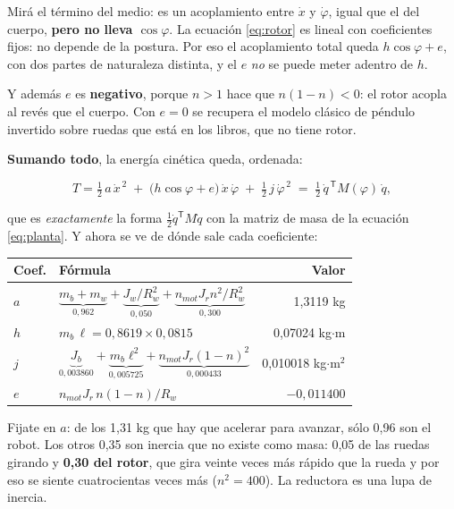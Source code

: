 \documentclass[11pt,a4paper]{report}
\begin{document}
\begin{ojo}
Mirá el término del medio: es un acoplamiento entre $\dot x$ y $\dot\varphi$, igual que el del
cuerpo, \textbf{pero no lleva $\cos\varphi$}. La ecuación \eqref{eq:rotor} es lineal con
coeficientes fijos: no depende de la postura. Por eso el acoplamiento total queda
$h\cos\varphi + e$, con dos partes de naturaleza distinta, y el $e$ \emph{no} se puede meter
adentro de $h$.

Y además $e$ es \textbf{negativo}, porque $n > 1$ hace que $n(1-n) < 0$: el rotor acopla al
revés que el cuerpo. Con $e = 0$ se recupera el modelo clásico de péndulo invertido sobre
ruedas que está en los libros, que no tiene rotor.
\end{ojo}

\textbf{Sumando todo}, la energía cinética queda, ordenada:

\begin{equation}\label{eq:T}
T = \tfrac12\,a\,\dot x^{\,2}
\;+\; \bigl(h\cos\varphi + e\bigr)\,\dot x\,\dot\varphi
\;+\; \tfrac12\,j\,\dot\varphi^{\,2}
\;=\; \tfrac12\,\dot q^{\,\mathsf{T}} M(\varphi)\,\dot q,
\end{equation}

que es \emph{exactamente} la forma $\tfrac12 \dot q^{\mathsf T} M \dot q$ con la matriz de masa
de la ecuación \eqref{eq:planta}. Y ahora se ve de dónde sale cada coeficiente:

\begin{center}
\small
\begin{tabular}{@{}llr@{}}
\toprule
\textbf{Coef.} & \textbf{Fórmula} & \textbf{Valor} \\
\midrule
$a$ & $\underbrace{m_b + m_w}_{0{,}962} + \underbrace{J_w/R_w^2}_{0{,}050} + \underbrace{n_{mot}J_r n^2/R_w^2}_{0{,}300}$ & 1{,}3119 kg \\[10pt]
$h$ & $m_b\,\ell = 0{,}8619 \times 0{,}0815$ & 0{,}07024 kg$\cdot$m \\[4pt]
$j$ & $\underbrace{J_b}_{0{,}003860} + \underbrace{m_b\ell^2}_{0{,}005725} + \underbrace{n_{mot}J_r(1-n)^2}_{0{,}000433}$ & 0{,}010018 kg$\cdot$m$^2$ \\[10pt]
$e$ & $n_{mot}J_r\,n(1-n)/R_w$ & $-0{,}011400$ \\
\bottomrule
\end{tabular}
\end{center}

\begin{idea}
Fijate en $a$: de los 1,31 kg que hay que acelerar para avanzar, sólo 0,96 son el robot.
Los otros 0,35 son inercia que no existe como masa: 0,05 de las ruedas girando y
\textbf{0,30 del rotor}, que gira veinte veces más rápido que la rueda y por eso se siente
cuatrocientas veces más ($n^2 = 400$). La reductora es una lupa de inercia.
\end{idea}
\end{document}

